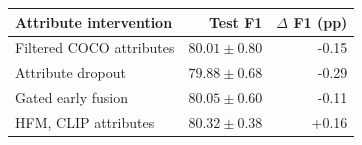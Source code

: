 \begin{tabular}{lrr}
\toprule
Attribute intervention & Test F1 & $\Delta$ F1 (pp) \\
\midrule
Filtered COCO attributes & $80.01\pm0.80$ & -0.15 \\
Attribute dropout & $79.88\pm0.68$ & -0.29 \\
Gated early fusion & $80.05\pm0.60$ & -0.11 \\
HFM, CLIP attributes & $80.32\pm0.38$ & +0.16 \\
\bottomrule
\end{tabular}
